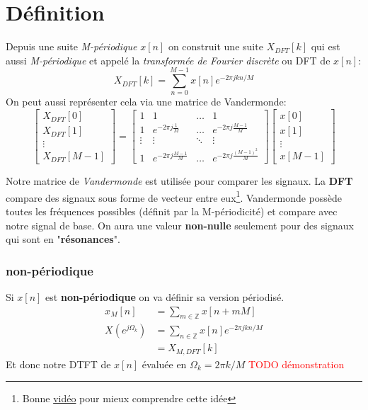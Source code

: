 \documentclass{report}
\begin{document}
\section{Définition}
Depuis une suite \textit{M-périodique} $x[n]$ on construit une suite $X_{DFT}[k]$ qui est aussi \textit{M-périodique} et appelé la \textit{transformée de Fourier discrète} ou DFT de $x[n]$:
\begin{equation}
X_{DFT}[k] = \sum_{n=0}^{M-1}x[n]e^{-2\pi j k n /M}
\end{equation}
On peut aussi représenter cela via une matrice de Vandermonde:
\begin{equation}
\begin{bmatrix}
X_{DFT}[0]\\
X_{DFT}[1]\\
\vdots\\
X_{DFT}[M-1]
\end{bmatrix} =
\begin{bmatrix}
1 & 1 & \ldots & 1\\
1 & e^{-2\pi j \frac{1}{M}} & \ldots & e^{-2\pi j \frac{M-1}{M}}\\
\vdots & \vdots & \ddots & \vdots\\
1 & e^{-2\pi j \frac{M-1}{M}} & \ldots & e^{-2 \pi j \frac{(M-1)^2}{M}} 
\end{bmatrix}
\begin{bmatrix}
x[0]\\
x[1]\\
\vdots \\
x[M-1]
\end{bmatrix}
\end{equation}

Notre matrice de \textit{Vandermonde} est utilisée pour comparer les signaux. La \textbf{DFT} compare des signaux sous forme de vecteur entre eux\footnote{Bonne \href{https://youtu.be/yYEMxqreA10?t=1294}{vidéo} pour mieux comprendre cette idée}. Vandermonde possède toutes les fréquences possibles (définit par la M-périodicité) et compare avec notre signal de base. On aura une valeur \textbf{non-nulle} seulement pour des signaux qui sont en "\textbf{résonances}". 

\subsubsection{non-périodique}
Si $x[n]$ est \textbf{non-périodique} on va définir sa version périodisé.
\begin{align*}
x_M[n] &= \sum_{m \in \mathbb{Z}} x[n + mM]\\
X(e^{j\Omega_k}) &= \sum_{n\in \mathbb{Z}} x[n]e^{-2\pi j k n/M}\\
&= X_{M, DFT}[k]
\end{align*}
Et donc notre DTFT de $x[n]$ évaluée en $\Omega_k = 2\pi k / M$
\textcolor{red}{TODO démonstration}
\end{document}
